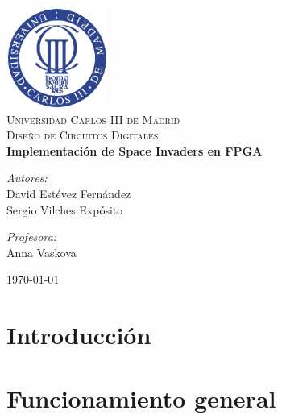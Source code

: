 \documentclass[11pt]{article}
\begin{document}
\begin{center}
\includegraphics[width=0.25\textwidth]{./uc3m.jpg}\\[2cm]
\textsc{\LARGE Universidad Carlos III de Madrid}\\[0.5cm]
\textsc{\Large Diseño de Circuitos Digitales}\\[4cm]


{\huge \bfseries{Implementación de Space Invaders en FPGA}\\[8cm]}


\begin{minipage}{0.55\textwidth}
\begin{flushleft} \large
\emph{Autores:}\\
David Estévez Fernández\\
Sergio Vilches Expósito\\
\end{flushleft}
\end{minipage}
\begin{minipage}{0.4\textwidth}
\begin{flushright} \large
\emph{Profesora:}\\
Anna Vaskova
\end{flushright}\end{minipage}\vfill

{\large \today}

\end{center}
%
\newpage
%
\tableofcontents
\newpage


\section{Introducción}

\section{Funcionamiento general}

\end{document}
